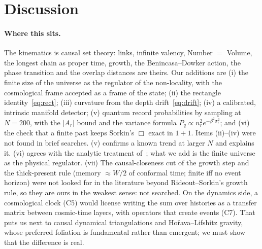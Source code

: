\documentclass[11pt,a4paper]{article}
\newcommand{\tagbox}[2]{\textsf{\scriptsize\colorbox{#1!12}{\textcolor{#1!70!black}{#2}}}}
\newcommand{\ours}{\tagbox{orange}{ours}}
\begin{document}
\section{Discussion}
\paragraph{Where this sits.} The kinematics is causal set theory: links, infinite valency, Number $=$ Volume, the longest chain as proper time, growth, the Benincasa--Dowker action, the phase transition and the overlap distances are theirs. Our additions are (i) the finite size of the universe as the regulator of the non-locality, with the cosmological frame accepted as a frame of the state; (ii) the rectangle identity~\eqref{eq:rect}; (iii) curvature from the depth drift~\eqref{eq:drift}; (iv) a calibrated, intrinsic manifold detector; (v) quantum record probabilities by sampling at $N=200$, with the $|A_r|$ bound and the variance formula $P_q\propto n_r^2e^{-\beta^2\sigma_r^2}$; and (vi) the check that a finite past keeps Sorkin's $\Box$ exact in $1+1$. Items (ii)--(iv) were not found in brief searches. (v) confirms a known trend at larger $N$ and explains it. (vi) agrees with the analytic treatment of~\cite{ASS14}; what we add is the finite universe as the physical regulator. (vii) The causal-closeness cut of the growth step and the thick-present rule (memory $\approx W/2$ of conformal time; finite iff no event horizon) were not looked for in the literature beyond Rideout--Sorkin's growth rule, so they are \ours{} in the weakest sense: not searched. On the dynamics side, a cosmological clock (C5) would license writing the sum over histories as a transfer matrix between cosmic-time layers, with operators that create events (C7). That puts us next to causal dynamical triangulations and Hořava--Lifshitz gravity, whose preferred foliation is fundamental rather than emergent; we must show that the difference is real.
\end{document}
